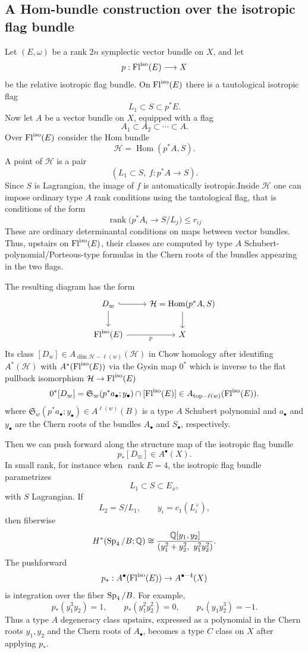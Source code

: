\documentclass[12pt]{article}
\begin{document}
\subsection{A Hom-bundle construction over the isotropic flag bundle}

Let $(E,\omega)$ be a rank $2n$ symplectic vector bundle on $X$, and let
\[
    p:\operatorname{Fl}^{\mathrm{iso}}(E)\longrightarrow X
\]
be the relative isotropic flag bundle. On $\operatorname{Fl}^{\mathrm{iso}}(E)$ there is a tautological isotropic flag
\[
    L_1\subset S\subset p^*E.
\]
Now let $A$ be a vector bundle on $X$, equipped with a flag
\[
    A_1\subset A_2\subset\cdots\subset A.
\]
Over $\operatorname{Fl}^{\mathrm{iso}}(E)$ consider the Hom bundle
\[
    \mathcal H=\operatorname{Hom}(p^*A,S).
\]
A point of $\mathcal H$ is a pair
\[
    (L_1\subset S,\ f:p^*A\to S).
\]
Since $S$ is Lagrangian, the image of $f$ is automatically isotropic.Inside $\mathcal H$ one can impose ordinary type $A$ rank conditions using the tautological flag, that is conditions of the form
\[
    \operatorname{rank}\bigl(p^*A_i\to S/L_j\bigr)\le r_{ij}
\]
These are ordinary determinantal conditions on maps between vector bundles. Thus, upstairs on $\operatorname{Fl}^{\mathrm{iso}}(E)$, their classes are computed by type $A$ Schubert-polynomial/Porteous-type formulas in the Chern roots of the bundles appearing in the two flags.

The resulting diagram has the form
\[
\begin{tikzcd}
D_{\varpi} \arrow[r, hook] \arrow[d] & \mathcal H=\operatorname{Hom}(p^*A,S) \arrow[d] \\
\mathrm{Fl}^{\mathrm{iso}}(E) \arrow[r, "p"'] & X
\end{tikzcd}
\]
Its class $[D_w]\in A_{\dim \mathcal H-\ell(w)}(\mathcal H)$ in Chow homology after identifing $A^*(\mathcal H)$ with $A^*(\operatorname{Fl}^{\mathrm{iso}}(E))$ via the Gysin map $0^*$ which is inverse to the flat pullback isomorphism $\mathcal H\to \operatorname{Fl}^{\mathrm{iso}}(E)$
\[
    0^*[D_{\varpi}]
    =
    \mathfrak S_{\varpi}(p^*a_\bullet;y_\bullet) \cap [\operatorname{Fl}^{\mathrm{iso}}(E)]\in A_{\text{top}-\ell(w)}(\operatorname{Fl}^{\mathrm{iso}}(E)).
\]
where $\mathfrak S_w(p^*a_\bullet;y_\bullet)\in A^{\ell(w)}(B)$ is a type $A$ Schubert polynomial and $a_\bullet$ and $y_\bullet$ are the Chern roots of the bundles $A_\bullet$ and $S_\bullet$, respectively.

Then we can push forward along the structure map of the isotropic flag bundle
\[
    p_*[D_{\varpi}]\in A^\bullet(X).
\]
In small rank, for instance when $\operatorname{rank}E=4$, the isotropic flag bundle parametrizes
\[
    L_1\subset S\subset E_x,
\]
with $S$ Lagrangian. If
\[
    L_2=S/L_1,\qquad
    y_i=c_1(L_i^\vee),
\]
then fiberwise
\[
    H^*(\operatorname{Sp}_4/B;\mathbb Q)
    \cong
    \frac{\mathbb Q[y_1,y_2]}
    {(y_1^2+y_2^2,\ y_1^2y_2^2)}.
\]
The pushforward
\[
    p_*:A^\bullet(\operatorname{Fl}^{\mathrm{iso}}(E))\to A^{\bullet-4}(X)
\]
is integration over the fiber $\operatorname{Sp}_4/B$. For example,
\[
    p_*(y_1^3y_2)=1,\qquad
    p_*(y_1^2y_2^2)=0,\qquad
    p_*(y_1y_2^3)=-1.
\]
Thus a type $A$ degeneracy class upstairs, expressed as a polynomial in the Chern roots $y_1,y_2$ and the Chern roots of $A_\bullet$, becomes a type $C$ class on $X$ after applying $p_*$.
\end{document}
